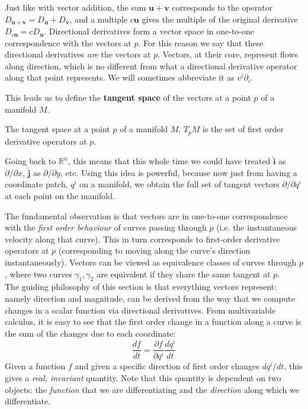\documentclass[../master.tex]{subfiles}
\begin{document}
	Just like with vector addition, the sum $\mathbf u + \mathbf v$ corresponds to the operator $ D_{\mathbf u + \mathbf v} = D_\mathbf u + D_\mathbf v$, and a multiple $c \mathbf u$ gives the multiple of the original derivative $D_{c \mathbf u} = c D_\mathbf u$. Directional derivatives form a vector space in one-to-one correspondence with the vectors at $p$.  For this reason we say that these directional derivatives \emph{are} the vectors at $p$. Vectors, at their core, represent flows along direction, which is no different from what a directional derivative operator along that point represents. We will sometimes abbreviate it as $v^i \partial_i$.
	
	This leads us to define the \textbf{tangent space} of the vectors at a point $p$ of a manifold $M$.
	\begin{defn}
		The tangent space at a point $p$ of a manifold $M$, $T_p M$ is the set of first order derivative operators at $p$.
	\end{defn}

	Going back to $\mathbb{R}^n$, this means that this whole time we could have treated $\hat{\mathbf{i}}$ as $\partial/\partial x$, $\hat{\mathbf{j}}$ as $\partial/\partial y$, etc. Using this idea is powerful, because now just from having a coordinate patch, $q^i$ on a manifold, we obtain the full set of tangent vectors $\partial/\partial q^i$ at each point on the manifold. 
	
	The fundamental observation is that vectors are in one-to-one correspondence with the \emph{first order behaviour} of curves passing through $p$ (i.e. the instantaneous velocity along that curve). This in turn corresponds to first-order derivative operators at $p$ (corresponding to moving along the curve's direction instantaneously). Vectors can be viewed as equivalence classes of curves through $p$, where two curves $\gamma_1, \gamma_2$ are equivalent if they share the same tangent at $p$. \\
	
	The guiding philosophy of this section is that everything vectors represent: namely direction and magnitude, can be derived from the way that we compute changes in a scalar function via directional derivatives. From multivariable calculus, it is easy to see that the first order change in a function along a curve is the sum of the changes due to each coordinate:
	\begin{equation}
		\frac{df}{dt} = \frac{\partial f}{\partial q^i} \frac{dq^i}{dt}
	\end{equation}
	Given a function $f$ and given a specific direction of first order changes $dq^i/dt$, this gives a \emph{real, invariant} quantity. Note that this quantity is dependent on two objects: the \emph{function} that we are differentiating and the \emph{direction} along which we differentiate.
	
\end{document}

